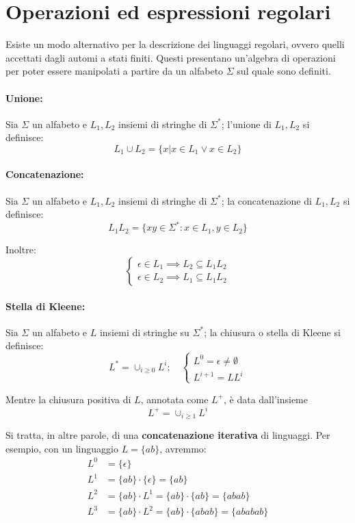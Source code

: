 \section{Operazioni ed espressioni regolari}
Esiste un modo alternativo per la descrizione dei linguaggi regolari, ovvero quelli accettati dagli automi a stati finiti. Questi presentano un'algebra
di operazioni per poter essere manipolati a partire da un alfabeto $\Sigma$ sul quale sono definiti.

\paragraph{Unione:} Sia $\Sigma$ un alfabeto e $L_1, L_2$ insiemi di stringhe di $\Sigma^*$; l'unione di $L_1, L_2$ si definisce: \[
    L_1 \cup L_2 = \{x | x\in L_1 \lor x\in L_2\}
\]

\paragraph{Concatenazione:} Sia $\Sigma$ un alfabeto e $L_1, L_2$ insiemi di stringhe di $\Sigma^*$; la concatenazione di $L_1, L_2$ si definisce: \[
    L_1L_2 = \{xy \in \Sigma^* : x\in L_1, y\in L_2\}
\]

\noindent Inoltre: \[ \begin{cases}
    \epsilon \in L_1 \implies L_2\subseteq L_1L_2\\
    \epsilon \in L_2 \implies L_1\subseteq L_1L_2
\end{cases} \]

\paragraph{Stella di Kleene:} Sia $\Sigma$ un alfabeto e $L$ insiemi di stringhe su $\Sigma^*$; la chiusura o stella di Kleene si definisce: \[
    L^* = \cup_{i \geq 0}L^i;\quad \begin{cases}
			L^0 = {\epsilon} \neq \emptyset\\
			L^{i+1} = LL^i
        \end{cases}
\]

\noindent Mentre la chiusura positiva di $L$, annotata come $L^+$, è data dall'insieme \[
    L^+ = \cup_{i \geq 1} L^i
\]

\noindent Si tratta, in altre parole, di una \textbf{concatenazione iterativa} di linguaggi. Per esempio, con un linguaggio $L = \{ab\}$, avremmo:
\begin{equation}
    \begin{split}
        L^0 &= \{\epsilon\}\\
        L^1 &= \{ab\} \cdot \{\epsilon\} = \{ab\}\\
        L^2 &= \{ab\} \cdot L^1 = \{ab\} \cdot \{ab\} = \{abab\}\\
        L^3 &= \{ab\} \cdot L^2 = \{ab\} \cdot \{abab\} = \{ababab\}
    \end{split}
\end{equation}

